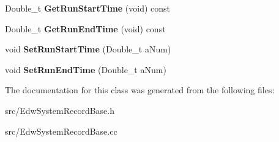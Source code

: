 \begin{DoxyCompactItemize}
\item 
\hypertarget{class_edw_system_record_base_a9928fb88970d242c138ff7933a3c2381}{
Double\_\-t {\bfseries GetRunStartTime} (void) const }
\label{class_edw_system_record_base_a9928fb88970d242c138ff7933a3c2381}

\item 
\hypertarget{class_edw_system_record_base_a272636752a5086b61aed363378d926b0}{
Double\_\-t {\bfseries GetRunEndTime} (void) const }
\label{class_edw_system_record_base_a272636752a5086b61aed363378d926b0}

\item 
\hypertarget{class_edw_system_record_base_a468211c705e450d0c6a93c7c85249844}{
void {\bfseries SetRunStartTime} (Double\_\-t aNum)}
\label{class_edw_system_record_base_a468211c705e450d0c6a93c7c85249844}

\item 
\hypertarget{class_edw_system_record_base_a36b55923fcb1f3147b60abc368227b34}{
void {\bfseries SetRunEndTime} (Double\_\-t aNum)}
\label{class_edw_system_record_base_a36b55923fcb1f3147b60abc368227b34}

\end{DoxyCompactItemize}


The documentation for this class was generated from the following files:\begin{DoxyCompactItemize}
\item 
src/EdwSystemRecordBase.h\item 
src/EdwSystemRecordBase.cc\end{DoxyCompactItemize}
